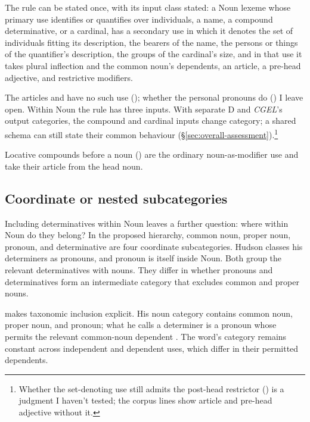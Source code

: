 \documentclass[12pt]{article}
\begin{document}
The rule can be stated once, with its input class stated: a Noun lexeme whose primary use identifies or quantifies over individuals, a name, a compound determinative, or a cardinal, has a secondary use in which it denotes the set of individuals fitting its description, the bearers of the name, the persons or things of the quantifier's description, the groups of the cardinal's size, and in that use it takes plural inflection and the common noun's dependents, an article, a pre-head adjective, and restrictive modifiers.

The articles and  have no such use (); whether the personal pronouns do () I leave open. Within Noun the rule has three inputs. With separate D and \textit{CGEL}'s output categories, the compound and cardinal inputs change category; a shared schema can still state their common behaviour (§\ref{sec:overall-assessment}).\footnote{Whether the set-denoting use still admits the post-head restrictor () is a judgment I haven't tested; the corpus lines show article and pre-head adjective without it.}

Locative compounds before a noun () are the ordinary noun-as-modifier use and take their article from the head noun.

\subsection{Coordinate or nested subcategories}\label{sec:inheritance}

Including determinatives within Noun leaves a further question: where within Noun do they belong? In the proposed hierarchy, common noun, proper noun, pronoun, and determinative are four coordinate subcategories. Hudson classes his determiners as pronouns, and pronoun is itself inside Noun. Both group the relevant determinatives with nouns. They differ in whether pronouns and determinatives form an intermediate category that excludes common and proper nouns.

\textcite[253--254]{hudson2010wordgrammar} makes taxonomic inclusion explicit. His noun category contains common noun, proper noun, and pronoun; what he calls a determiner is a pronoun whose  permits the relevant common-noun dependent \citep[9--10]{hudson2004determiners}. The word's category remains constant across independent and dependent uses, which differ in their permitted dependents.
\end{document}
